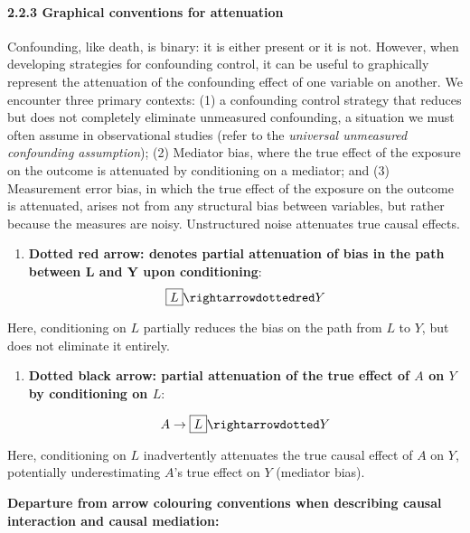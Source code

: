 \documentclass[
  singlecolumn]{article}
\let\oldparagraph\paragraph
\renewcommand{\paragraph}[1]{\oldparagraph{#1}\mbox{}}
\providecommand{\tightlist}{%
  \setlength{\itemsep}{0pt}\setlength{\parskip}{0pt}}\usepackage{longtable,booktabs,array}
\begin{document}
\paragraph{2.2.3 Graphical conventions for
attenuation}\label{graphical-conventions-for-attenuation}

Confounding, like death, is binary: it is either present or it is not.
However, when developing strategies for confounding control, it can be
useful to graphically represent the attenuation of the confounding
effect of one variable on another. We encounter three primary contexts:
(1) a confounding control strategy that reduces but does not completely
eliminate unmeasured confounding, a situation we must often assume in
observational studies (refer to the \emph{universal unmeasured
confounding assumption}); (2) Mediator bias, where the true effect of
the exposure on the outcome is attenuated by conditioning on a mediator;
and (3) Measurement error bias, in which the true effect of the exposure
on the outcome is attenuated, arises not from any structural bias
between variables, but rather because the measures are noisy.
Unstructured noise attenuates true causal effects.

\begin{enumerate}
\def\labelenumi{\arabic{enumi}.}
\tightlist
\item
  \textbf{Dotted red arrow: denotes partial attenuation of bias in the
  path between L and Y upon conditioning}:
  \[ \boxed{L} \rightarrowdottedred Y \]
\end{enumerate}

Here, conditioning on \(L\) partially reduces the bias on the path from
\(L\) to \(Y\), but does not eliminate it entirely.

\begin{enumerate}
\def\labelenumi{\arabic{enumi}.}
\setcounter{enumi}{1}
\item
  \textbf{Dotted black arrow: partial attenuation of the true effect of
  \(A\) on \(Y\) by conditioning on \(L\)}:

  \[ A \to \boxed{L} \rightarrowdotted Y \]
\end{enumerate}

Here, conditioning on \(L\) inadvertently attenuates the true causal
effect of \(A\) on \(Y\), potentially underestimating \(A\)'s true
effect on \(Y\) (mediator bias).

\textbf{Departure from arrow colouring conventions when describing
causal interaction and causal mediation:}
\end{document}
